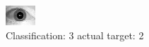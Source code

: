 \begin{figure}[h!]
\begin{center}
\includegraphics[width=0.60\columnwidth]{figures/ID1765_class_3_target_2.png}
\end{center}
\caption{ Classification: 3 actual target: 2}
\label{fig:ID1765_class_3_target_2}
\end{figure}
